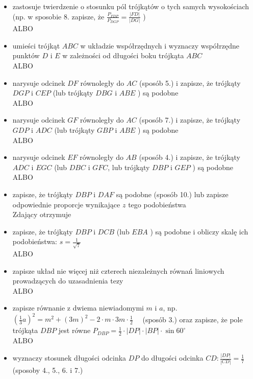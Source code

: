 \documentclass[10pt]{article}
\begin{document}
\begin{itemize}
  \item zastosuje twierdzenie o stosunku pól trójkątów o tych samych wysokościach (np. w sposobie 8. zapisze, że $\frac{P_{F D P}}{P_{D G P}}=\frac{|F D|}{|D G|}$ )\\
ALBO
  \item umieści trójkąt $A B C$ w układzie współrzędnych i wyznaczy współrzędne punktów $D$ i $E$ w zależności od długości boku trójkąta $A B C$\\
ALBO
  \item narysuje odcinek $D F$ równoległy do $A C$ (sposób 5.) i zapisze, że trójkąty $D G P$ i $C E P$ (lub trójkąty $D B G$ i $A B E$ ) są podobne\\
ALBO
  \item narysuje odcinek $G F$ równoległy do $A C$ (sposób 7.) i zapisze, że trójkąty $G D P$ i $A D C$ (lub trójkąty $G B P$ i $A B E$ ) są podobne\\
ALBO
  \item narysuje odcinek $E F$ równoległy do $A B$ (sposób 4.) i zapisze, że trójkąty $A D C$ i $E G C$ (lub $D B C$ i $G F C$, lub trójkąty $D B P$ i $G E P$ ) są podobne\\
ALBO
  \item zapisze, że trójkąty $D B P$ i $D A F$ są podobne (sposób 10.) lub zapisze odpowiednie proporcje wynikające $z$ tego podobieństwa\\
Zdający otrzymuje
  \item zapisze, że trójkąty $D B P$ i $D C B$ (lub $E B A$ ) są podobne i obliczy skalę ich podobieństwa: $s=\frac{1}{\sqrt{7}}$\\
ALBO
  \item zapisze układ nie więcej niż czterech niezależnych równań liniowych prowadzących do uzasadnienia tezy\\
ALBO
  \item zapisze równanie z dwiema niewiadomymi $m$ i $a$, np.\\
$\left(\frac{1}{3} a\right)^{2}=m^{2}+(3 m)^{2}-2 \cdot m \cdot 3 m \cdot \frac{1}{2} \quad$ (sposób 3.) oraz zapisze, że pole trójkąta $D B P$ jest równe $P_{D B P}=\frac{1}{2} \cdot|D P| \cdot|B P| \cdot \sin 60^{\circ}$\\
ALBO
  \item wyznaczy stosunek długości odcinka $D P$ do długości odcinka $C D: \frac{|D P|}{|C D|}=\frac{1}{7}$ (sposoby 4., 5., 6. i 7.)
\end{itemize}
\end{document}
